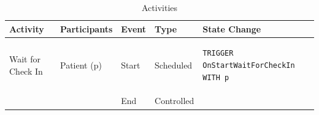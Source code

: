 \documentclass[
  10pt,
  a4paperpaper,
  DIV=11,
  numbers=noendperiod,
  oneside]{scrreprt}
\begin{document}
\begin{longtable}{@{}>{\raggedright\arraybackslash}p{1.8cm}>{\raggedright\arraybackslash}p{2.1cm}>{\raggedright\arraybackslash}p{0.9cm}>{\raggedright\arraybackslash}p{2.2cm}>{\raggedright\arraybackslash}p{8cm}@{}}

\caption{\label{tbl-activities_lab1}Activities}

\tabularnewline

  \toprule
  Activity          & Participants & Event & Type       & State Change \\ \midrule
  \endhead
  Wait for Check In & Patient (p)  & Start & Scheduled  & 
  \vspace{-12pt}
  \begin{lstlisting}[language=CMPseudo]
TRIGGER OnStartWaitForCheckIn WITH p
  \end{lstlisting}
  \\[-12pt] \cmidrule{3-5}
                    &              & End   & Controlled &
  

\end{longtable}
\end{document}
